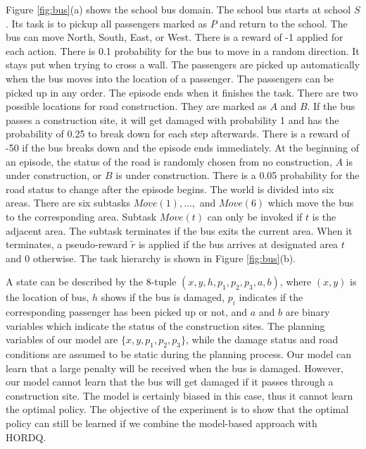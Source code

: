 Figure \ref{fig:bus}(a) shows the school bus domain. The school bus starts at school $S$. Its task 
is to pickup all passengers marked as $P$ and return to the school.
The bus can move North, South, East, or West. There is a reward of -1 applied for each action.
There is 0.1 probability for the bus to move in a random direction. It stays put 
when trying to cross a wall. 
The passengers are picked up automatically when the bus moves into
the location of a passenger. The passengers can be picked up in any order.
The episode ends when it finishes the task.  
There are two possible locations for road construction. They are marked as 
$A$ and $B$. If the bus passes a construction site, it will get damaged with probability 1 and has the probability
of 0.25 to break down for each step afterwards. There is a reward of -50 if the bus breaks down and the episode ends immediately. 
At the beginning of an episode, the status of the road is randomly chosen from no construction, $A$ is under construction,
or $B$ is under construction. There is a 0.05 probability for the road status to change after the episode begins.
The world is divided into six areas. There are six subtasks $Move(1), \dots,$ and $Move(6)$ which move the
bus to the corresponding area.
Subtask $Move(t)$ can only be invoked if $t$ is the adjacent area.
The subtask terminates if the bus exits the current area.
When it terminates, a pseudo-reward $\tilde{r}$ is applied if the bus arrives at designated area $t$ and 0 otherwise.
The task hierarchy is shown in Figure \ref{fig:bus}(b). 

A state can be described by the 8-tuple $(x, y, h, p_1, p_2, p_3, a, b)$, where $(x, y)$ is the location of 
bus, $h$ shows if the bus is damaged, $p_i$ indicates if the corresponding passenger has been picked up or not,
and $a$ and $b$ are binary variables which indicate the status of the construction sites.
The planning variables of our model are $\{x, y, p_1, p_2, p_3\}$, while the damage
status and road conditions are assumed to be static during the planning process.
Our model can learn that a large penalty will be received when the bus is damaged.  
However, our model cannot learn that the bus will get damaged if it passes through
a construction site. The model is certainly biased in this case, thus
it cannot learn the optimal policy. The objective of 
the experiment is to show that the optimal policy can still be learned
if we combine the model-based approach with HORDQ. 

